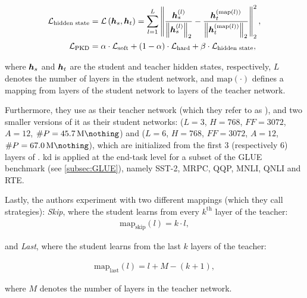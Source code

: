 \begin{align}
    \mathcal{L}_{\text{hidden state}} &= \loss{\hvect_s, \hvect_t} = \sum_{l=1}^L \norm{\frac{\hvect_s^{(l)}}{\norm{\hvect_s^{(l)}}_2} - \frac{\hvect_t^{(\text{map}(l))}}{\norm{\hvect_t^{(\text{map}(l))}}_2}}_2^2, \\
    \mathcal{L}_{\text{PKD}} &= \alpha \cdot \mathcal{L}_{\text{soft}} + (1 - \alpha) \cdot \mathcal{L}_{\text{hard}} + \beta \cdot \mathcal{L}_{\text{hidden state}},
\end{align}

where $\hvect_s$ and $\hvect_t$ are the student and teacher hidden states, respectively, $L$ denotes the number of layers in the student network, and $\text{map}(\cdot)$ defines a mapping from layers of the student network to layers of the teacher network. 

Furthermore, they use \bertbase as their teacher network (which they refer to as \berttwelve), and two smaller versions of it as their student networks: \bertthree ($L=3$, $H=768$, $FF = 3072$, $A=12$, $\#P=\SI{45.7}{\mega\nothing}$) and \bertsix ($L=6$, $H=768$, $FF = 3072$, $A=12$, $\#P=\SI{67.0}{\mega\nothing}$), which are initialized from the first 3 (respectively 6) layers of \bertbase. \gls{kd} is applied at the end-task level for a subset of the GLUE benchmark (see \cref{subsec:GLUE}), namely SST-2, MRPC, QQP, MNLI, QNLI and RTE.

Lastly, the authors experiment with two different mappings (which they call strategies):  \emph{Skip}, where the student learns from every $k^{\text{th}}$ layer of the teacher:
\begin{align*}
    \text{map}_{\text{skip}}(l) = k \cdot l,
\end{align*}

 and \emph{Last}, where the student learns from the last $k$ layers of the teacher:
 
\begin{align*}
    \text{map}_{\text{last}}(l) = l + M - (k + 1),
\end{align*}

where $M$ denotes the number of layers in the teacher network.


